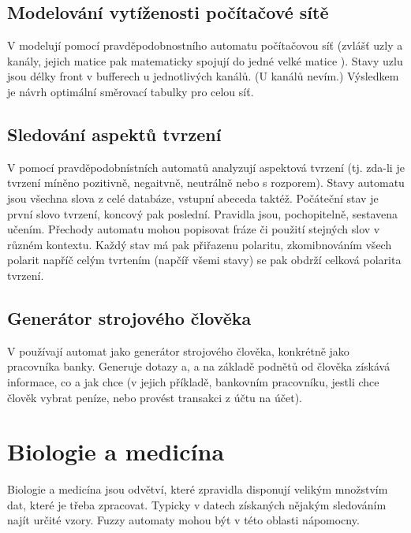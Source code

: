 \documentclass[a4paper,10pt]{article}
\begin{document}
\subsection{Modelování vytíženosti počítačové sítě}

V \cite{Niz-ModComComNetViaPrAu} modelují pomocí pravděpodobnostního automatu počítačovou síť (zvlášť uzly a kanály, jejich matice pak matematicky spojují do jedné velké matice ). Stavy uzlu jsou délky front v bufferech u jednotlivých kanálů. (U kanálů nevím.) Výsledkem je návrh optimální směrovací tabulky pro celou síť. 

\subsection{Sledování aspektů tvrzení}
V \cite{Cas+-ProAutAspBasSenAna} pomocí pravděpodobnístních automatů analyzují aspektová tvrzení (tj. zda-li je tvrzení míněno pozitivně, negaitvně, neutrálně nebo s rozporem). Stavy automatu jsou všechna slova z celé databáze, vstupní abeceda taktéž. Počáteční stav je první slovo tvrzení, koncový pak poslední. Pravidla jsou, pochopitelně, sestavena učením. Přechody automatu mohou popisovat fráze či použití stejných slov v různém kontextu. Každý stav má pak přiřazenu polaritu, zkomibnováním všech polarit napříč celým tvrtením (napčíř všemi stavy) se pak obdrží celková polarita tvrzení.

\subsection{Generátor strojového člověka}
V \cite{SchYou-ProSimHumMacDia} používají automat jako generátor strojového člověka, konkrétně jako pracovníka banky. Generuje dotazy a, a na základě podnětů od člověka získává informace, co a jak chce (v jejich příkladě, bankovním pracovníku, jestli chce člověk vybrat peníze, nebo provést transakci z účtu na účet). 

\section{Biologie a medicína}

Biologie a medicína jsou odvětví, které zpravidla disponují velikým množstvím dat, které je třeba zpracovat. Typicky v datech získaných nějakým sledováním najít určité vzory. Fuzzy automaty mohou být v této oblasti nápomocny.
\end{document}
